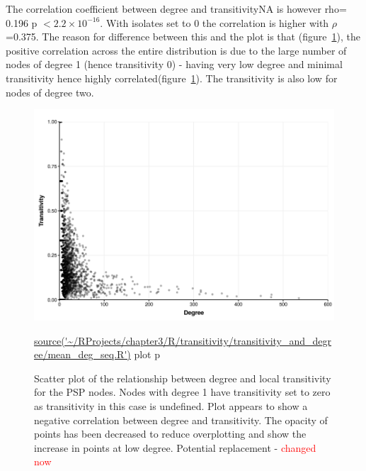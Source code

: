 The correlation coefficient between degree and transitivityNA is however rho= 0.196 p $< 2.2 \times 10^{-16}$. With isolates set to 0 the correlation is higher with $\rho$=0.375. The reason for difference between this and the plot is that (figure~\ref{fig:Scatter plot of the relationship between degree and local transitivity for the PSP nodes}), the positive correlation across the entire distribution is due to the large number of nodes of degree 1 (hence transitivity 0) - having very low degree and minimal transitivity hence highly correlated(figure~\ref{fig:Scatter plot of the relationship between degree and local transitivity for the PSP nodes}). The transitivity is also low for nodes of degree two.

\begin{figure}
    \centering
    \includegraphics[width=\textwidth]{images/chapter3/ggplot2/degree_and_transitivity/Rplot_scatterplot_c_and_degree_new_format.png}
      \caption{Scatter plot of the relationship between degree and local transitivity for the PSP nodes. Nodes with degree 1 have transitivity set to zero as transitivity in this case is undefined. Plot appears to show a negative correlation between degree and transitivity. The opacity of points has been decreased to reduce overplotting and show the increase in points at low degree. Potential replacement - \textcolor{red}{changed now} }
      \tiny\url{source('~/RProjects/chapter3/R/transitivity/transitivity_and_degree/mean_deg_seq.R')} plot p
    \label{fig:Scatter plot of the relationship between degree and local transitivity for the PSP nodes}
    
\end{figure}

